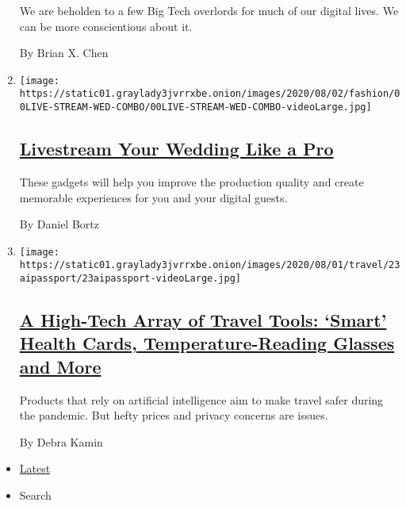 \begin{enumerate}
  We are beholden to a few Big Tech overlords for much of our digital
  lives. We can be more conscientious about it.

  By Brian X. Chen
\item
  \texttt{[image: https://static01.graylady3jvrrxbe.onion/images/2020/08/02/fashion/00LIVE-STREAM-WED-COMBO/00LIVE-STREAM-WED-COMBO-videoLarge.jpg]}

  \hypertarget{livestream-your-wedding-like-a-pro}{%
  \subsection{\texorpdfstring{\href{/2020/07/28/fashion/weddings/livestream-your-wedding-like-a-pro.html}{Livestream
  Your Wedding Like a
  Pro}}{Livestream Your Wedding Like a Pro}}\label{livestream-your-wedding-like-a-pro}}

  These gadgets will help you improve the production quality and create
  memorable experiences for you and your digital guests.

  By Daniel Bortz
\item
  \texttt{[image: https://static01.graylady3jvrrxbe.onion/images/2020/08/01/travel/23aipassport/23aipassport-videoLarge.jpg]}

  \hypertarget{a-high-tech-array-of-travel-tools-smart-health-cards-temperature-reading-glasses-and-more}{%
  \subsection{\texorpdfstring{\href{/2020/07/23/travel/artificial-intelligence-coronavirus-passport.html}{A
  High-Tech Array of Travel Tools: `Smart' Health Cards,
  Temperature-Reading Glasses and
  More}}{A High-Tech Array of Travel Tools: `Smart' Health Cards, Temperature-Reading Glasses and More}}\label{a-high-tech-array-of-travel-tools-smart-health-cards-temperature-reading-glasses-and-more}}

  Products that rely on artificial intelligence aim to make travel safer
  during the pandemic. But hefty prices and privacy concerns are issues.

  By Debra Kamin
\end{enumerate}

\begin{itemize}
\tightlist
\item
  \protect\hyperlink{stream-panel}{Latest}
\item
  Search
\end{itemize}

